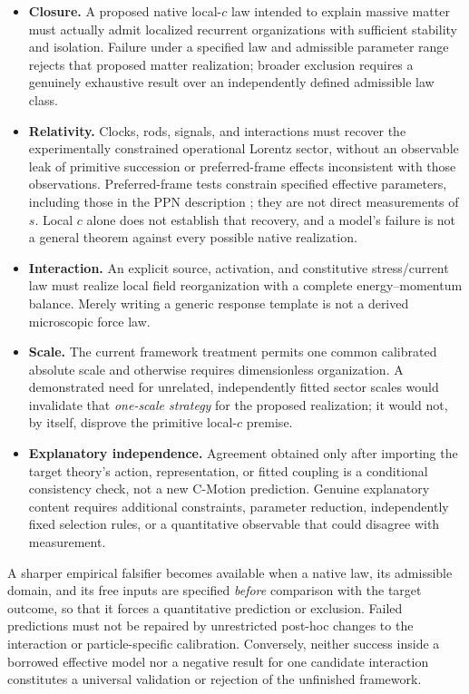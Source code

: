 \documentclass[11pt]{article}
\theoremstyle{definition}
\newcommand{\cmotion}{\mbox{C-Motion}}
\begin{document}
\begin{itemize}
  \item \textbf{Closure.}  A proposed native local-$c$ law intended to explain
  massive matter must actually admit localized recurrent organizations with
  sufficient stability and isolation.  Failure under a specified law and
  admissible parameter range rejects that proposed matter realization;
  broader exclusion requires a genuinely exhaustive result over an
  independently defined admissible law class.

  \item \textbf{Relativity.}  Clocks, rods, signals, and interactions must
  recover the experimentally constrained operational Lorentz sector, without
  an observable leak of primitive succession or preferred-frame effects
  inconsistent with those observations.  Preferred-frame tests constrain specified
effective parameters, including those in the PPN description
\cite{Will2014Confrontation}; they are not direct measurements of $s$.
Local $c$ alone does not establish
  that recovery, and a model's failure is not a general theorem against every
  possible native realization.

  \item \textbf{Interaction.}  An explicit source, activation, and
  constitutive stress/current law must realize local field reorganization
  with a complete energy--momentum balance.  Merely writing a generic
  response template is not a derived microscopic force law.

  \item \textbf{Scale.}  The current framework treatment permits one common
  calibrated absolute scale and otherwise requires dimensionless
  organization.  A demonstrated need for unrelated, independently fitted
  sector scales would invalidate that \emph{one-scale strategy} for the
  proposed realization; it would not, by itself, disprove the primitive
  local-$c$ premise.

  \item \textbf{Explanatory independence.}  Agreement obtained only after
  importing the target theory's action, representation, or fitted coupling
  is a conditional consistency check, not a new \cmotion{} prediction.
  Genuine explanatory content requires additional constraints, parameter
  reduction, independently fixed selection rules, or a quantitative
  observable that could disagree with measurement.
\end{itemize}

A sharper empirical falsifier becomes available when a native law, its
admissible domain, and its free inputs are specified \emph{before} comparison
with the target outcome, so that it forces a quantitative prediction or
exclusion.  Failed predictions must not be repaired by unrestricted
post-hoc changes to the interaction or particle-specific calibration.
Conversely, neither success inside a borrowed effective model nor a negative
result for one candidate interaction constitutes a universal validation or
rejection of the unfinished framework.
\end{document}
